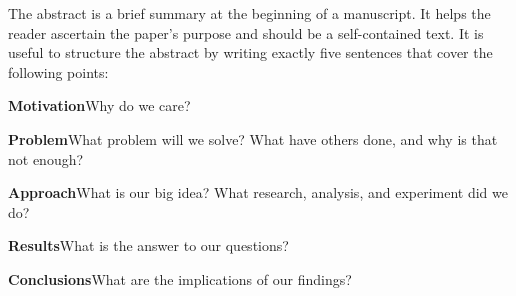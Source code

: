 The abstract is a brief summary at the beginning of a manuscript. It helps the reader ascertain the paper’s purpose and should be a self-contained text. It is useful to structure the abstract by writing exactly five sentences that cover the following points:

\textbf{Motivation}Why do we care?

\textbf{Problem}What problem will we solve? What have others done, and why is that not enough?

\textbf{Approach}What is our big idea? What research, analysis, and experiment did we do?

\textbf{Results}What is the answer to our questions?

\textbf{Conclusions}What are the implications of our findings?